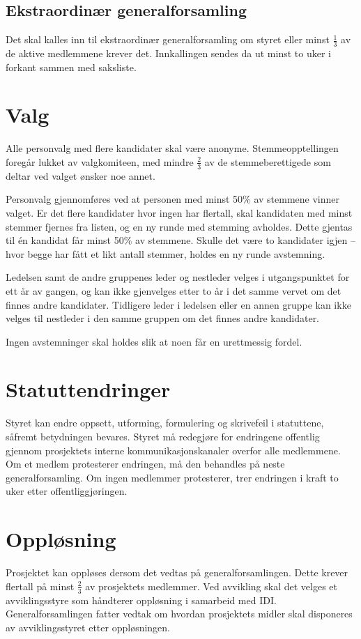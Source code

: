 \subsection{Ekstraordinær generalforsamling}\label{sec:generalforsamling:ekstraordinær}
Det skal kalles inn til ekstraordinær generalforsamling om styret eller minst $\frac{1}{3}$ av de aktive medlemmene krever det.
Innkallingen sendes da ut minst to uker i forkant sammen med saksliste.


\section{Valg}\label{sec:valg}
Alle personvalg med flere kandidater skal være anonyme.
Stemmeopptellingen foregår lukket av valgkomiteen, med mindre $\frac{2}{3}$ av de stemmeberettigede som deltar ved valget ønsker noe annet.

Personvalg gjennomføres ved at personen med minst 50\% av stemmene vinner valget.
Er det flere kandidater hvor ingen har flertall, skal kandidaten med minst stemmer fjernes fra listen, og en ny runde med stemming avholdes.
Dette gjentas til én kandidat får minst 50\% av stemmene.
Skulle det være to kandidater igjen -- hvor begge har fått et likt antall stemmer, holdes en ny runde avstemning.

Ledelsen samt de andre gruppenes leder og nestleder velges i utgangspunktet for ett år av gangen, og kan ikke gjenvelges etter to år i det samme vervet om det finnes andre kandidater.
Tidligere leder i ledelsen eller en annen gruppe kan ikke velges til nestleder i den samme gruppen om det finnes andre kandidater.

Ingen avstemninger skal holdes slik at noen får en urettmessig fordel.


\section{Statuttendringer}\label{sec:statuttendringer}
Styret kan endre oppsett, utforming, formulering og skrivefeil i statuttene, såfremt betydningen bevares.
Styret må redegjøre for endringene offentlig gjennom prosjektets interne kommunikasjonskanaler overfor alle medlemmene.
Om et medlem protesterer endringen, må den behandles på neste generalforsamling.
Om ingen medlemmer protesterer, trer endringen i kraft to uker etter offentliggjøringen.


\section{Oppløsning}\label{sec:oppløsning}
Prosjektet kan oppløses dersom det vedtas på generalforsamlingen.
Dette krever flertall på minst $\frac{2}{3}$ av prosjektets medlemmer.
Ved avvikling skal det velges et avviklingsstyre som håndterer oppløsning i samarbeid med IDI.\@
Generalforsamlingen fatter vedtak om hvordan prosjektets midler skal disponeres av avviklingsstyret etter oppløsningen.
